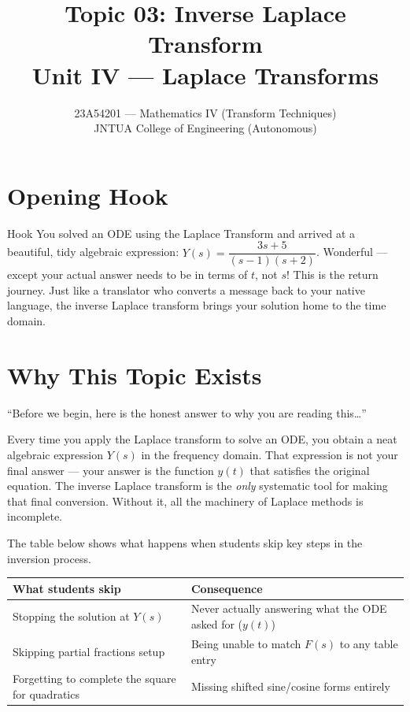 \documentclass[12pt,a4paper]{article}
\title{Topic 03: Inverse Laplace Transform \\ \large Unit IV --- Laplace Transforms}
\author{23A54201 --- Mathematics IV (Transform Techniques) \\
        JNTUA College of Engineering (Autonomous)}
\date{}
\begin{document}
\maketitle
\tableofcontents
\newpage

\section{Opening Hook}

\begin{curiositybox}{Hook}
You solved an ODE using the Laplace Transform and arrived at a beautiful, tidy algebraic
expression: $Y(s) = \dfrac{3s+5}{(s-1)(s+2)}$. Wonderful --- except your actual answer
needs to be in terms of $t$, not $s$! This is the return journey. Just like a translator
who converts a message back to your native language, the inverse Laplace transform brings
your solution home to the time domain.
\end{curiositybox}

\section{Why This Topic Exists}

``Before we begin, here is the honest answer to why you are reading this\ldots''

Every time you apply the Laplace transform to solve an ODE, you obtain a neat
algebraic expression $Y(s)$ in the frequency domain.  That expression is not
your final answer --- your answer is the function $y(t)$ that satisfies the
original equation.  The inverse Laplace transform is the \emph{only} systematic
tool for making that final conversion.  Without it, all the machinery of Laplace
methods is incomplete.

\medskip
\noindent The table below shows what happens when students skip key steps in the
inversion process.

\begin{center}
\begin{tabular}{@{} p{6cm} p{7cm} @{}}
\toprule
\textbf{What students skip} & \textbf{Consequence} \\
\midrule
Stopping the solution at $Y(s)$ &
    Never actually answering what the ODE asked for ($y(t)$) \\
\midrule
Skipping partial fractions setup &
    Being unable to match $F(s)$ to any table entry \\
\midrule
Forgetting to complete the square for quadratics &
    Missing shifted sine/cosine forms entirely \\
\bottomrule
\end{tabular}
\end{center}
\end{document}
